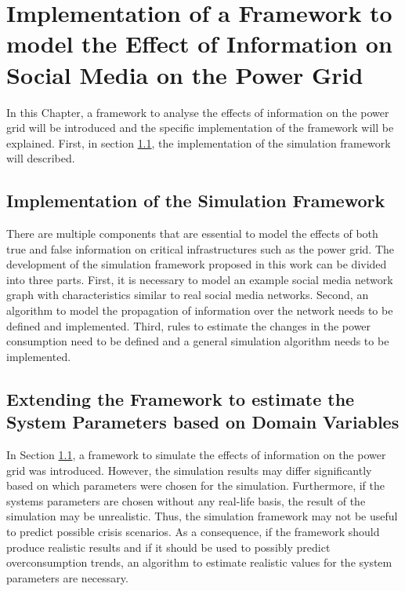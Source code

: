 \chapter{Implementation of a Framework to model the Effect
of Information on Social Media on the Power Grid}

In this Chapter, a framework to analyse the effects of information on the 
power grid will be introduced and the specific implementation of the 
framework will be explained.
First, in section \ref{simulationframeworksection}, 
the implementation of the simulation framework will described.


\section{Implementation of the Simulation Framework}
\label{simulationframeworksection}
There are multiple components that are essential to model the effects of 
both true and false information on critical infrastructures
such as the power grid. The development of the simulation framework
proposed in this work can be divided into three parts. First, it is necessary to model an 
example social media network graph with characteristics similar to
real social media networks. Second, an algorithm to model the 
propagation of information over the network needs to be defined and 
implemented. Third, rules to estimate the changes in the power consumption 
need to be defined and a general simulation algorithm needs to be implemented.




\section{Extending the Framework to estimate the System Parameters based on
Domain Variables}

In Section \ref{simulationframeworksection}, a framework to simulate the effects 
of information on the power grid was introduced. However, the simulation results
may differ significantly based on which parameters were chosen for the simulation.
Furthermore, if the systems parameters are chosen without any real-life basis,
the result of the simulation may be unrealistic. Thus, the simulation framework 
may not be useful to predict possible crisis scenarios.
As a consequence, if the framework should produce realistic results and if
it should be used to possibly predict overconsumption trends, an 
algorithm to estimate realistic values for the system parameters are necessary.

